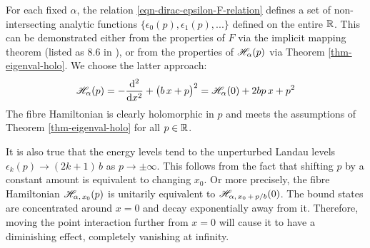 \bigskip

For each fixed $\alpha$, the relation \eqref{eqn-dirac-epsilon-F-relation} defines a set of non-intersecting analytic functions $\big\{ \epsilon_0(p), \epsilon_1(p), ... \big\}$ defined on the entire $\mathbb{R}$. This can be demonstrated either from the properties of $F$ via the implicit mapping theorem (listed as 8.6 in \cite{KaupKaup1983}), or from the properties of $\mathscr{H}_\alpha(p)$ via Theorem \ref{thm-eigenval-holo}. We choose the latter approach:
\begin{equation*}
    \mathscr{H}_\alpha(p)
    = -\frac{\mathrm{d} ^2}{\mathrm{d} x^2} + \big( b \, x + p \big)^2
    = \mathscr{H}_\alpha(0) + 2bp \, x + p^2
\end{equation*}
The fibre Hamiltonian is clearly holomorphic in $p$ and meets the assumptions of Theorem \ref{thm-eigenval-holo} for all $p \in \mathbb{R}$.

It is also true that the energy levels tend to the unperturbed Landau levels $\epsilon_k(p) \to (2k + 1)\, b$ as $p \to \pm \infty$. This follows from the fact that shifting $p$ by a constant amount is equivalent to changing $x_0$. Or more precisely, the fibre Hamiltonian $\mathscr{H}_{\alpha, \, x_0}(p)$ is unitarily equivalent to $\mathscr{H}_{\alpha, \, x_0 \, + \, p/b}(0)$. The bound states are concentrated around $x=0$ and decay exponentially away from it. Therefore, moving the point interaction further from $x=0$ will cause it to have a diminishing effect, completely vanishing at infinity.

